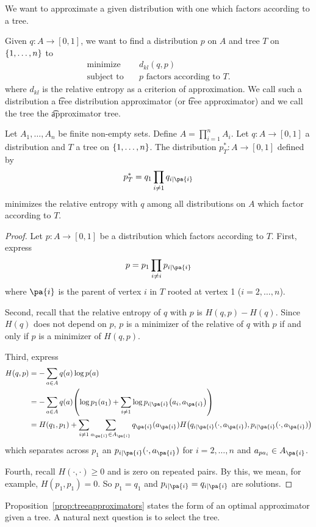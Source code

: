 

We want to approximate a given distribution with one which factors according to a tree.


Given $q: A \to [0, 1]$, we want to find a distribution $p$ on $A$ and tree $T$ on $\{1, \dots, n\}$ to
  \[
\begin{aligned}
\text{minimize} & \quad d_{kl}(q, p) \\
\text{subject to} & \quad p \text{ factors according to } T.
\end{aligned}
  \]
where $d_{kl}$ is the relative entropy as a criterion of approximation.
We call such a distribution a \t{tree distribution approximator} (or \t{tree approximator}) and we call the tree the \t{approximator tree}.


\begin{prop}

Let $A_1, \dots, A_n$ be finite non-empty sets.
Define $A = \prod_{i = 1}^{n} A_i$.
Let $q: A \to [0, 1]$ a distribution and $T$ a tree on $\{1, \dots, n\}$.
The distribution $p^*_T: A \to [0, 1]$ defined by
  \[
p^*_T = q_1 \prod_{i \neq 1} q_{i \mid \pa{i}}
  \]
minimizes the relative entropy with $q$ among all distributions on $A$ which factor according to $T$.

\begin{proof}

Let $p: A \to [0, 1]$ be a distribution which factors according to $T$.
First, express
  \[
p = p_1 \prod_{i \neq i} p_{i \mid \pa{i}}
  \]
where $\pa{i}$ is the parent of vertex $i$ in $T$ rooted at vertex 1 ($i = 2, \dots, n$).

Second, recall that the relative entropy of $q$ with $p$ is $H(q, p) - H(q)$.
Since $H(q)$ does not depend on $p$, $p$ is a minimizer of the relative of $q$ with $p$ if and only if $p$ is a minimizer of $H(q, p)$.

Third, express
  \[
\begin{aligned}
H(q, p) &= - \sum_{a \in A} q(a) \log p(a) \\
&= - \sum_{a \in A} q(a) \parens*{\log p_1(a_1) + \sum_{i \neq 1} \log p_{i \mid \pa{i}}\parens*{a_i, a_{\pa{i}}}} \\
&= H(q_1, p_1) + \sum_{i \neq 1} \sum_{a_{\pa{i}} \in A_{\pa{i}}} q_{\pa{i}}(a_{\pa{i}})H\parens*{q_{i\mid\pa{i}}(\cdot, a_{\pa{i}}), p_{i\mid\pa{i}}(\cdot, a_{\pa{i}})}
\end{aligned}
  \]
which separates across $p_1$ an $p_{i \mid \pa{i}}(\cdot, a_{\pa{i}})$ for $i = 2, \dots, n$ and $a_{pa_{i}} \in A_{\pa{i}}$.

Fourth, recall $H(\cdot, \cdot) \geq 0$ and is zero on repeated pairs.
By this, we mean, for example, $H(p_1, p_1) = 0$.
So $p_1 = q_1$ and $p_{i \mid \pa{i}} = q_{i \mid \pa{i}}$ are solutions.

\end{proof}

\label{prop:treeapproximators}
\end{prop}

Proposition~\ref{prop:treeapproximators} states the form of an optimal approximator given a tree.
A natural next question is to select the tree.
